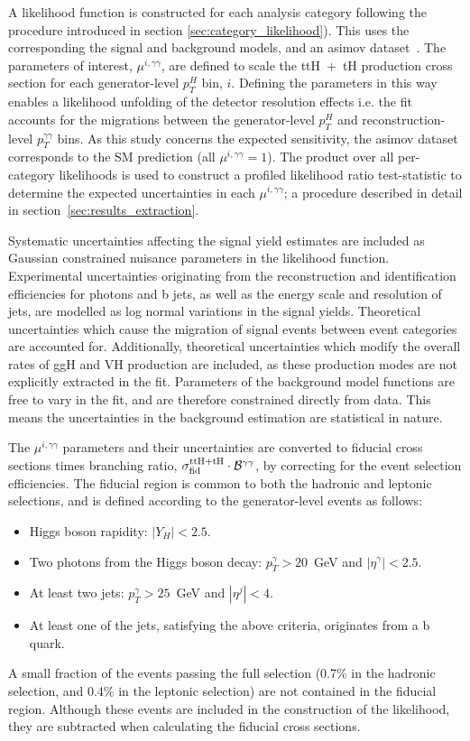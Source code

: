 A likelihood function is constructed for each analysis category following the procedure introduced in section \ref{sec:category_likelihood}). This uses the corresponding the signal and background models, and an asimov dataset~\cite{Cowan:2010js}. The parameters of interest, $\mu^{i,\gamma\gamma}$, are defined to scale the ttH~+~tH production cross section for each generator-level $p_T^H$ bin, $i$. Defining the parameters in this way enables a likelihood unfolding of the detector resolution effects i.e. the fit accounts for the migrations between the generator-level $p_T^H$ and reconstruction-level $p_T^{\gamma\gamma}$ bins. As this study concerns the expected sensitivity, the asimov dataset corresponds to the SM prediction (all $\mu^{i,\gamma\gamma}=1$). The product over all per-category likelihoods is used to construct a profiled likelihood ratio test-statistic to determine the expected uncertainties in each $\mu^{i,\gamma\gamma}$; a procedure described in detail in section~\ref{sec:results_extraction}.

Systematic uncertainties affecting the signal yield estimates are included as Gaussian constrained nuisance parameters in the likelihood function. Experimental uncertainties originating from the reconstruction and identification efficiencies for photons and b jets, as well as the energy scale and resolution of jets, are modelled as log normal variations in the signal yields. Theoretical uncertainties which cause the migration of signal events between event categories are accounted for. Additionally, theoretical uncertainties which modify the overall rates of ggH and VH production are included, as these production modes are not explicitly extracted in the fit. Parameters of the background model functions are free to vary in the fit, and are therefore constrained directly from data. This means the uncertainties in the background estimation are statistical in nature.

The $\mu^{i,\gamma\gamma}$ parameters and their uncertainties are converted to fiducial cross sections times branching ratio, $\sigma^{\rm{ttH+tH}}_{\rm{fid}}\cdot\mathcal{B}^{\gamma\gamma}$, by correcting for the event selection efficiencies. The fiducial region is common to both the hadronic and leptonic selections, and is defined according to the generator-level events as follows:
\begin{itemize}
    \item Higgs boson rapidity: $|Y_H|<2.5$.
    \item Two photons from the Higgs boson decay: $p_T^\gamma > 20$~GeV and $|\eta^\gamma|<2.5$.
    \item At least two jets: $p_T^\gamma > 25$~GeV and $|\eta^j|<4$.
    \item At least one of the jets, satisfying the above criteria, originates from a b quark.
\end{itemize}
\noindent
A small fraction of the events passing the full selection (0.7\% in the hadronic selection, and 0.4\% in the leptonic selection) are not contained in the fiducial region. Although these events are included in the construction of the likelihood, they are subtracted when calculating the fiducial cross sections.

